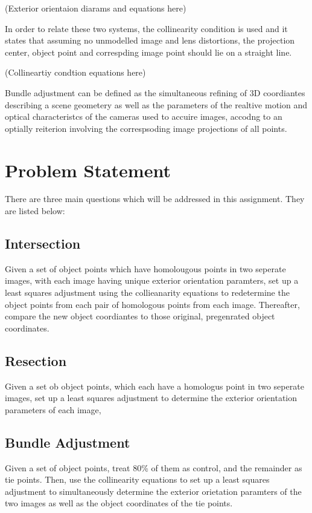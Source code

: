 \documentclass{article}
\begin{document}
(Exterior orientaion diarams and equations here)

In order to relate these two systems, the collinearity condition is used and it states that assuming no unmodelled image and lens
distortions, the projection center, object point and correspding image point should lie on a straight line.

(Collineartiy condtion equations here)

Bundle adjustment can be defined as the simultaneous refining of 3D coordiantes describing a scene geometery as well 
as the parameters of the realtive motion and optical characteristcs of the cameras used to accuire images, 
accodng to an optially reiterion involving the correspsoding image projections of all points.


\section{Problem Statement}
There are three main questions which will be addressed in this assignment. They are listed below:

\subsection{Intersection}
Given a set of object points which have homolougous points in two seperate images, with each image having unique exterior 
orientation paramters, set up a least squares adjustment using the collieanarity equations to redetermine the object points 
from each pair of homologous points from each image. Thereafter, compare the new object coordiantes to those original, 
pregenrated object coordinates.

\subsection{Resection}
Given a set ob object points, which each have a homologus point in two seperate images, set up a least squares adjustment 
to determine the exterior orientation parameters of each image,

\subsection{Bundle Adjustment}
Given a set of object points, treat 80\% of them as control, and the remainder as tie points. 
Then, use the collinearity equations to set up a least squares adjustment to simultaneously determine the exterior 
orietation paramters of the two images as well as the object coordinates of the tie points.
\end{document}
